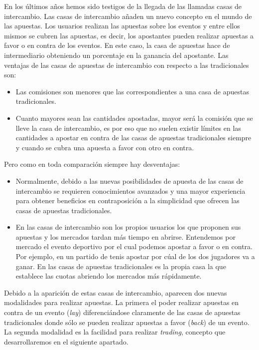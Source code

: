 En los últimos años hemos sido testigos de la llegada de las llamadas casas de intercambio. 
Las casas de intercambio añaden un nuevo concepto en el mundo de las apuestas. Los usuarios realizan las apuestas sobre los eventos y entre ellos mismos se cubren las apuestas, es decir, los apostantes pueden realizar apuestas a favor o en contra de los eventos. 
 En este caso, la casa de apuestas hace de intermediario obteniendo un porcentaje en la ganancia del apostante. %
 Las ventajas de las casas de apuestas de intercambio con respecto a las tradicionales son:
\begin{itemize}
	\item Las comisiones son menores que las correspondientes a una casa de apuestas tradicionales.
	\item Cuanto mayores sean las cantidades apostadas, mayor será la comisión que se lleve la casa de intercambio, es por eso que no suelen existir límites en las cantidades a apostar en contra de las casas de apuestas tradicionales siempre y cuando se cubra una apuesta a favor con otro en contra.%
\end{itemize}
Pero como en toda comparación siempre hay desventajas: 
\begin{itemize}
	\item Normalmente, debido a las nuevas posibilidades de apuesta de las casas de intercambio se requieren conocimientos avanzados y una mayor experiencia para obtener beneficios en contraposición a la simplicidad que ofrecen las casas de apuestas tradicionales.
	\item En las casas de intercambio son los propios usuarios los que proponen sus apuestas y los mercados tardan más tiempo en abrirse. Entendemos por mercado el evento deportivo por el cual podemos apostar a favor o en contra. Por ejemplo, en un partido de tenis apostar por cúal de los dos jugadores va a ganar. En las casas de apuestas tradicionales es la propia casa la que establece las cuotas abriendo los mercados más rápidamente.
\end{itemize}

Debido a la aparición de estas casas de intercambio, aparecen dos nuevas modalidades para realizar apuestas. La primera el poder realizar apuestas en contra de un evento (\emph{lay})  diferenciándose claramente de las casas de apuestas tradicionales donde sólo se pueden realizar apuestas a favor (\emph{back}) de un evento.
 La segunda modalidad es la facilidad para realizar \emph{trading}, concepto que desarrollaremos en el siguiente apartado.

